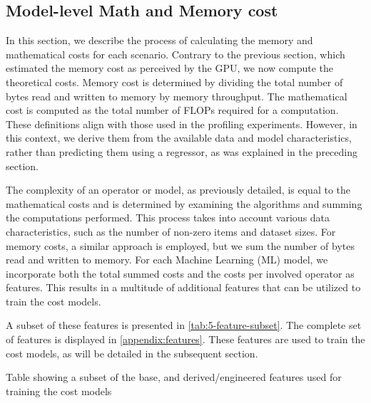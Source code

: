 \subsection{Model-level Math and Memory cost}
\label{subsec:5-model-level-cost}
In this section, we describe the process of calculating the memory and mathematical costs for each scenario. Contrary to the previous section, which estimated the memory cost as perceived by the GPU, we now compute the theoretical costs. Memory cost is determined by dividing the total number of bytes read and written to memory by memory throughput. The mathematical cost is computed as the total number of FLOPs required for a computation. These definitions align with those used in the profiling experiments. However, in this context, we derive them from the available data and model characteristics, rather than predicting them using a regressor, as was explained in the preceding section.

The complexity of an operator or model, as previously detailed, is equal to the mathematical costs and is determined by examining the algorithms and summing the computations performed. This process takes into account various data characteristics, such as the number of non-zero items and dataset sizes. For memory costs, a similar approach is employed, but we sum the number of bytes read and written to memory. For each Machine Learning (ML) model, we incorporate both the total summed costs and the costs per involved operator as features. This results in a multitude of additional features that can be utilized to train the cost models.

A subset of these features is presented in \autoref{tab:5-feature-subset}. The complete set of features is displayed in \autoref{appendix:features}. These features are used to train the cost models, as will be detailed in the subsequent section.

\begin{table}[ht]
    
    \caption[Feature table]{Table showing a subset of the base, and derived/engineered features used for training the cost models}
    \label{tab:5-feature-subset}
\end{table}

